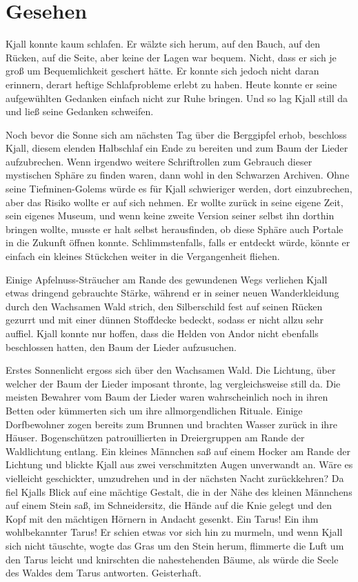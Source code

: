 \newpage
\section{Gesehen}


Kjall konnte kaum schlafen. Er wälzte sich herum, auf den Bauch, auf den Rücken, auf die Seite, aber keine der Lagen war bequem. Nicht, dass er sich je groß um Bequemlichkeit geschert hätte. Er konnte sich jedoch nicht daran erinnern, derart heftige Schlafprobleme erlebt zu haben. Heute konnte er seine aufgewühlten Gedanken einfach nicht zur Ruhe bringen. Und so lag Kjall still da und ließ seine Gedanken schweifen.

Noch bevor die Sonne sich am nächsten Tag über die Berggipfel erhob, beschloss Kjall, diesem elenden Halbschlaf ein Ende zu bereiten und zum Baum der Lieder aufzubrechen. Wenn irgendwo weitere Schriftrollen zum Gebrauch dieser mystischen Sphäre zu finden waren, dann wohl in den Schwarzen Archiven. Ohne seine Tiefminen-Golems würde es für Kjall schwieriger werden, dort einzubrechen, aber das Risiko wollte er auf sich nehmen. Er wollte zurück in seine eigene Zeit, sein eigenes Museum, und wenn keine zweite Version seiner selbst ihn dorthin bringen wollte, musste er halt selbst herausfinden, ob diese Sphäre auch Portale in die Zukunft öffnen konnte. Schlimmstenfalls, falls er entdeckt würde, könnte er einfach ein kleines Stückchen weiter in die Vergangenheit fliehen.

Einige Apfelnuss-Sträucher am Rande des gewundenen Wegs verliehen Kjall etwas dringend gebrauchte Stärke, während er in seiner neuen Wanderkleidung durch den Wachsamen Wald strich, den Silberschild fest auf seinen Rücken gezurrt und mit einer dünnen Stoffdecke bedeckt, sodass er nicht allzu sehr auffiel. Kjall konnte nur hoffen, dass die Helden von Andor nicht ebenfalls beschlossen hatten, den Baum der Lieder aufzusuchen.\bigskip



Erstes Sonnenlicht ergoss sich über den Wachsamen Wald. Die Lichtung, über welcher der Baum der Lieder imposant thronte, lag vergleichsweise still da. Die meisten Bewahrer vom Baum der Lieder waren wahrscheinlich noch in ihren Betten oder kümmerten sich um ihre allmorgendlichen Rituale. Einige Dorfbewohner zogen bereits zum Brunnen und brachten Wasser zurück in ihre Häuser. Bogenschützen patrouillierten in Dreiergruppen am Rande der Waldlichtung entlang. Ein kleines Männchen saß auf einem Hocker am Rande der Lichtung und blickte Kjall aus zwei verschmitzten Augen unverwandt an. Wäre es vielleicht geschickter, umzudrehen und in der nächsten Nacht zurückkehren? Da fiel Kjalls Blick auf eine mächtige Gestalt, die in der Nähe des kleinen Männchens auf einem Stein saß, im Schneidersitz, die Hände auf die Knie gelegt und den Kopf mit den mächtigen Hörnern in Andacht gesenkt. Ein Tarus! Ein ihm wohlbekannter Tarus! Er schien etwas vor sich hin zu murmeln, und wenn Kjall sich nicht täuschte, wogte das Gras um den Stein herum, flimmerte die Luft um den Tarus leicht und knirschten die nahestehenden Bäume, als würde die Seele des Waldes dem Tarus antworten. Geisterhaft.

